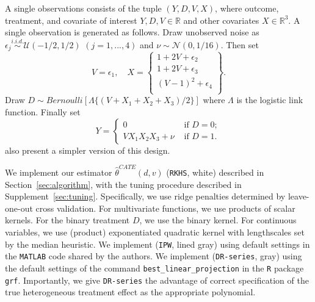 A single observations consists of the tuple $(Y,D,V,X)$, where outcome, treatment, and covariate of interest $Y,D,V\in\mathbb{R}$ and other covariates $X\in\mathbb{R}^3$. A single observation is generated as follows. Draw unobserved noise as $\epsilon_j \overset{i.i.d.}{\sim}\mathcal{U}(-1/2,1/2)$ $(j=1,...,4)$ and $\nu\sim \mathcal{N}(0,1/16)$. Then set
$$
V=\epsilon_1,\quad X=\begin{Bmatrix} 1+2V+\epsilon_2 \\ 1+2V+\epsilon_3 \\ (V-1)^2+\epsilon_4 \\ \end{Bmatrix}.
$$
Draw $D\sim Bernoulli[\Lambda \{(V+X_1+X_2+X_3)/2\}]$ where $\Lambda$ is the logistic link function. Finally set
$$
Y=\begin{cases} 0 &\text{ if } D=0;\\ V X_1 X_2 X_3+\nu &\text{ if } D=1. \end{cases}
$$
\cite{abrevaya2015estimating} also present a simpler version of this design.

We implement our estimator $\hat{\theta}^{CATE}(d,v)$ (\texttt{RKHS}, white) described in Section~\ref{sec:algorithm}, with the tuning procedure described in Supplement~\ref{sec:tuning}. Specifically, we use ridge penalties determined by leave-one-out cross validation. For multivariate functions, we use products of scalar kernels. For the binary treatment $D$, we use the binary kernel. For continuous variables, we use (product) exponentiated quadratic kernel with lengthscales set by the median heuristic. We implement \cite{abrevaya2015estimating} (\texttt{IPW}, lined gray) using default settings in the \texttt{MATLAB} code shared by the authors. We implement \cite{semenova2021debiased} (\texttt{DR-series}, gray) using the default settings of the command \texttt{best\_linear\_projection} in the \texttt{R} package \texttt{grf}. Importantly, we give \texttt{DR-series} the advantage of correct specification of the true heterogeneous treatment effect as the appropriate polynomial.